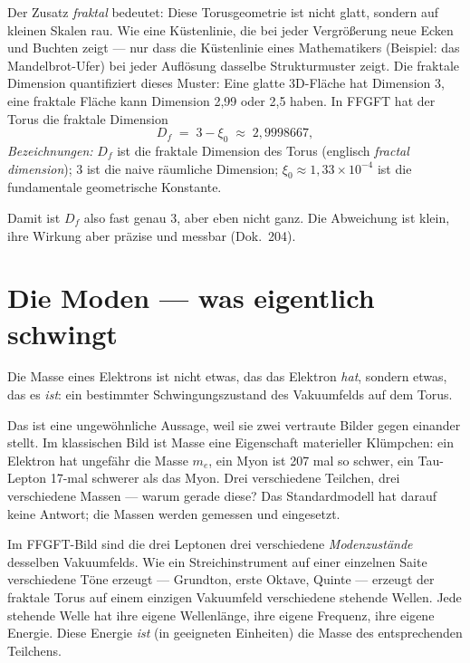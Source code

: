 Der Zusatz \emph{fraktal} bedeutet: Diese Torusgeometrie ist nicht
glatt, sondern auf kleinen Skalen rau. Wie eine Küstenlinie, die bei
jeder Vergrößerung neue Ecken und Buchten zeigt --- nur dass die
Küstenlinie eines Mathematikers (Beispiel: das Mandelbrot-Ufer) bei
jeder Auflösung dasselbe Strukturmuster zeigt. Die fraktale Dimension
quantifiziert dieses Muster: Eine glatte 3D-Fläche hat Dimension 3,
eine fraktale Fläche kann Dimension 2,99 oder 2,5 haben. In FFGFT
hat der Torus die fraktale Dimension
\[
  D_f \;=\; 3 - \xi_0 \;\approx\; 2{,}9998667,
\]
\noindent\textit{Bezeichnungen:} $D_f$ ist die fraktale Dimension
des Torus (englisch \emph{fractal dimension}); $3$ ist die naive
räumliche Dimension; $\xi_0 \approx 1{,}33\times 10^{-4}$ ist die
fundamentale geometrische Konstante.

\medskip\noindent
Damit ist $D_f$ also fast genau 3, aber eben nicht ganz. Die Abweichung
ist klein, ihre Wirkung aber präzise und messbar (Dok.~204).

\section{Die Moden --- was eigentlich schwingt}

Die Masse eines Elektrons ist nicht etwas, das das Elektron
\emph{hat}, sondern etwas, das es \emph{ist}: ein bestimmter
Schwingungszustand des Vakuumfelds auf dem Torus.

Das ist eine ungewöhnliche Aussage, weil sie zwei vertraute Bilder
gegen einander stellt. Im klassischen Bild ist Masse eine Eigenschaft
materieller Klümpchen: ein Elektron hat ungefähr die Masse $m_e$,
ein Myon ist 207 mal so schwer, ein Tau-Lepton 17-mal schwerer als
das Myon. Drei verschiedene Teilchen, drei verschiedene Massen ---
warum gerade diese? Das Standardmodell hat darauf keine Antwort; die
Massen werden gemessen und eingesetzt.

Im FFGFT-Bild sind die drei Leptonen drei verschiedene
\emph{Modenzustände} desselben Vakuumfelds. Wie ein Streichinstrument
auf einer einzelnen Saite verschiedene Töne erzeugt --- Grundton,
erste Oktave, Quinte --- erzeugt der fraktale Torus auf einem
einzigen Vakuumfeld verschiedene stehende Wellen. Jede stehende
Welle hat ihre eigene Wellenlänge, ihre eigene Frequenz, ihre eigene
Energie. Diese Energie \emph{ist} (in geeigneten Einheiten) die
Masse des entsprechenden Teilchens.

